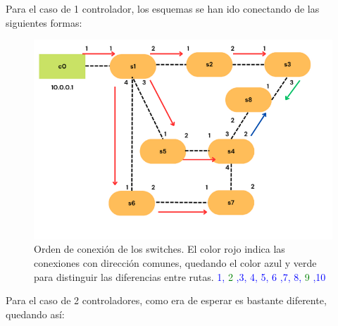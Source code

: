 \documentclass[a4paper, 12pt]{book}
\begin{document}
 	Para el caso de 1 controlador, los esquemas se han ido conectando de las siguientes formas:
 	
 	\begin{figure}[H]
 		\centering
 		\includegraphics[width=12cm, keepaspectratio]{img/rutasEscenario1-1c}
 		\caption{Orden de conexión de los switches. El color rojo indica las conexiones con dirección comunes, quedando el color azul y verde para distinguir las diferencias entre rutas. \textcolor{blue}{1,}  \textcolor{green}{2}  \textcolor{blue}{,3, 4, 5, 6 ,7, 8,}  \textcolor{green}{9} \textcolor{blue}{,10}}
 		\label{figura:escenario1_1c_1}
 	\end{figure}
 	
 	Para el caso de 2 controladores, como era de esperar es bastante diferente, quedando así:
 	
\end{document}
